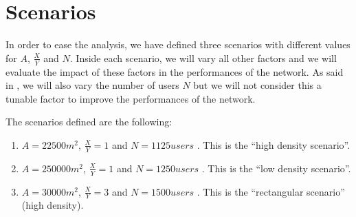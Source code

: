 \section{Scenarios}\label{sec:scenarios}

In order to ease the analysis, we have defined three scenarios with different
values for \(A\), \(\frac{X}{Y}\) and \(N\). Inside each scenario, we will vary
all other factors and we will evaluate the impact of these factors in the
performances of the network. As said in , we will also vary
the number of users \(N\) but we will not consider this a tunable factor to
improve the performances of the network.

The scenarios defined are the following:
\begin{enumerate}
	\item \(A = 22500m^2\), \(\frac{X}{Y} = 1\)  and \(N = 1125\mathit{users}\) . This is the ``high density
		scenario''.
	\item \(A = 250000m^2\), \(\frac{X}{Y} = 1\)  and \(N = 1250\mathit{users}\) . This is the ``low density
		scenario''.
	\item \(A = 30000m^2\), \(\frac{X}{Y} = 3\)  and \(N = 1500\mathit{users}\) . This is the
		``rectangular scenario'' (high density).
\end{enumerate}


